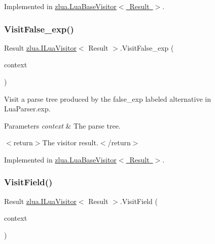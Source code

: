 Implemented in \mbox{\hyperlink{classzlua_1_1_lua_base_visitor_a3ff9e871538d959c429d61daf4f8c0c3}{zlua.\+Lua\+Base\+Visitor$<$ Result $>$}}.

\mbox{\label{interfacezlua_1_1_i_lua_visitor_ad1a1446a4713b3b0e796d4e15e6946fc}} 
\subsubsection{\texorpdfstring{Visit\+False\+\_\+exp()}{VisitFalse\_exp()}}
{\footnotesize\ttfamily Result \mbox{\hyperlink{interfacezlua_1_1_i_lua_visitor}{zlua.\+I\+Lua\+Visitor}}$<$ Result $>$.Visit\+False\+\_\+exp (\begin{DoxyParamCaption}\item[{\mbox{[}\+Not\+Null\mbox{]} \mbox{\hyperlink{classzlua_1_1_lua_parser_1_1_false__exp_context}{Lua\+Parser.\+False\+\_\+exp\+Context}}}]{context }\end{DoxyParamCaption})}



Visit a parse tree produced by the {\ttfamily false\+\_\+exp} labeled alternative in Lua\+Parser.\+exp. 


\begin{DoxyParams}{Parameters}
{\em context} & The parse tree.\\
\hline
\end{DoxyParams}
$<$return$>$The visitor result.$<$/return$>$ 

Implemented in \mbox{\hyperlink{classzlua_1_1_lua_base_visitor_a4c9fede80d7358d76c558891a1909ab3}{zlua.\+Lua\+Base\+Visitor$<$ Result $>$}}.

\mbox{\label{interfacezlua_1_1_i_lua_visitor_ae8386424ca34e372ed88360de953a962}} 
\subsubsection{\texorpdfstring{Visit\+Field()}{VisitField()}}
{\footnotesize\ttfamily Result \mbox{\hyperlink{interfacezlua_1_1_i_lua_visitor}{zlua.\+I\+Lua\+Visitor}}$<$ Result $>$.Visit\+Field (\begin{DoxyParamCaption}\item[{\mbox{[}\+Not\+Null\mbox{]} \mbox{\hyperlink{classzlua_1_1_lua_parser_1_1_field_context}{Lua\+Parser.\+Field\+Context}}}]{context }\end{DoxyParamCaption})}



